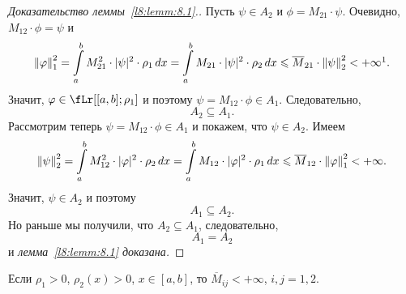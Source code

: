 \begin{proof}[Доказательство леммы~\ref{l8:lemm:8.1}.]
	Пусть $\psi\in A_2$ и $\phi=M_{21}\cdot\psi$. Очевидно, $M_{12}\cdot\phi=\psi$ и 
	\begin{equation*}
		\norm{\phi}_1^2=\int\limits_{a}^{b}M_{21}^2\cdot|\psi|^2\cdot\rho_1\,dx=\int\limits_{a}^{b}M_{21}\cdot|\psi|^2\cdot\rho_2\,dx\leqslant\overline{M}_{21}\cdot\norm{\psi}_2^2<+\infty\footnotemark{}.
	\end{equation*}%
	Значит, $\phi\in\fLr[{[a,b];\rho_1}]$ и поэтому $\psi=M_{12}\cdot\phi\in A_1$. Следовательно{\mb,}
	\begin{equation*}
		A_2\subseteq A_1.
	\end{equation*}
	Рассмотрим теперь $\psi=M_{12}\cdot\phi\in A_1$ и покажем, что $\psi\in A_2$. Имеем
	\begin{equation*}
		\left\|\psi\right\|_2^2=\int\limits_a^b M_{12}^2\cdot|\varphi|^2\cdot\rho_2\,dx=\int\limits_a^b M_{12}\cdot|\varphi|^2\cdot\rho_1\,dx\leqslant\overline{M}_{12}\cdot\left\|\varphi\right\|_1^2<+\infty.
	\end{equation*}
	Значит, $\psi\in A_2$ и поэтому 
	\begin{equation*}
		A_1\subseteq A_2.
	\end{equation*}
	Но раньше мы получили, что $A_2\subseteq A_1$, следовательно{\mb,}
	\begin{equation*}
		A_1=A_2
	\end{equation*}
	и \emph{лемма~\ref{l8:lemm:8.1} доказана.}
\end{proof}
\begin{_rem}
	Если $\rho_1>0$, $\rho_2(x)>0$, $x\in[a,b]$, то $\overline{M}_{ij}<+\infty$, $i,j=1,2$.
\end{_rem}
